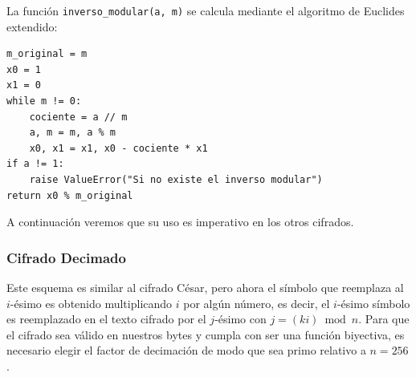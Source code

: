 \documentclass[12pt, a4paper]{article}
\begin{document}
La función \texttt{inverso\_modular(a, m)} se calcula mediante el
algoritmo de Euclides extendido:

\begin{verbatim}
m_original = m
x0 = 1
x1 = 0
while m != 0:
    cociente = a // m
    a, m = m, a % m
    x0, x1 = x1, x0 - cociente * x1
if a != 1:
    raise ValueError("Si no existe el inverso modular")
return x0 % m_original
\end{verbatim}

A continuación veremos que su uso es imperativo en los otros cifrados.

\subsubsection*{Cifrado Decimado}

Este esquema es similar al cifrado César, pero ahora el símbolo que reemplaza al $i$-ésimo es obtenido
multiplicando $i$ por algún número, es decir, el $i$-ésimo símbolo es reemplazado en el texto cifrado por
el $j$-ésimo con $j = (ki) \bmod n$. Para que el cifrado sea válido en nuestros bytes y cumpla con ser 
una función biyectiva, es necesario elegir el factor de decimación de modo que sea primo relativo a $n = 256$.
\end{document}
